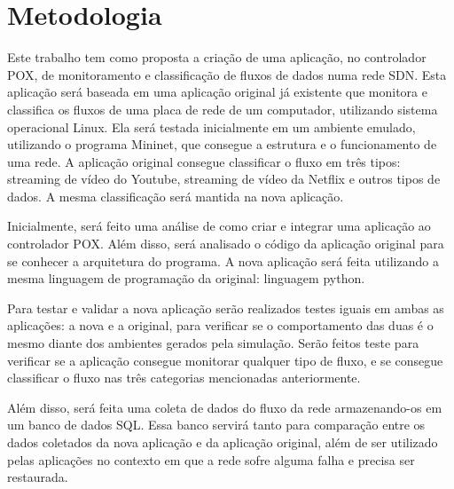 \chapter{ Metodologia }

Este trabalho tem como proposta a criação de uma aplicação, no controlador POX, de monitoramento e classificação de fluxos de dados numa rede SDN. Esta aplicação será baseada em uma aplicação original já existente que monitora e classifica os fluxos de uma placa de rede de um computador, utilizando sistema operacional Linux. Ela será testada inicialmente em um ambiente emulado, utilizando o programa Mininet, que consegue a estrutura e o funcionamento de uma rede. A aplicação original consegue classificar o fluxo em três tipos: streaming de vídeo do Youtube, streaming de vídeo da Netflix e outros tipos de dados. A mesma classificação será mantida na nova aplicação.

Inicialmente, será feito uma análise de como criar e integrar uma aplicação ao controlador POX. Além disso, será analisado o código da aplicação original para se conhecer a arquitetura do programa. A nova aplicação será feita utilizando a mesma linguagem de programação da original: linguagem python.

Para testar e validar a nova aplicação serão realizados testes iguais em ambas as aplicações: a nova e a original, para verificar se o comportamento das duas é o mesmo diante dos ambientes gerados pela simulação. Serão feitos teste para verificar se a aplicação consegue monitorar qualquer tipo de fluxo, e se consegue classificar o fluxo nas três categorias mencionadas anteriormente.

Além disso, será feita uma coleta de dados do fluxo da rede armazenando-os em um banco de dados SQL. Essa banco servirá tanto para comparação entre os dados coletados da nova aplicação e da aplicação original, além de ser utilizado pelas aplicações no contexto em que a rede sofre alguma falha e precisa ser restaurada.